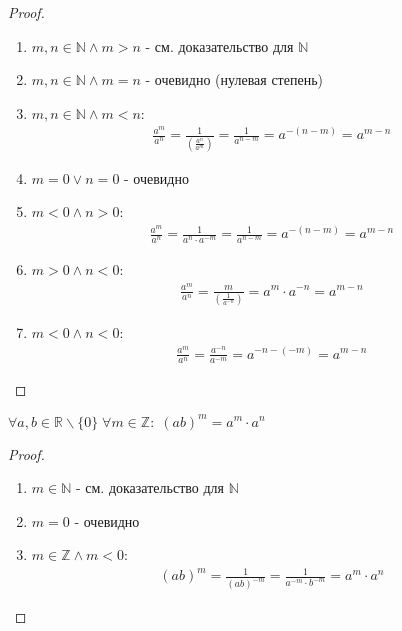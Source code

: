 \begin{proof}
    \hfill

    \begin{enumerate}
        \item $m,n \in \mathbb{N} \land m > n$ - см. доказательство для $\mathbb{N}$
        \item $m,n \in \mathbb{N} \land m = n$ - очевидно (нулевая степень)
        \item $m,n \in \mathbb{N} \land m < n$:
        \begin{align*}
            \frac{a^m}{a^n} = \frac{1}{(\frac{a^n}{a^m})} = \frac{1}{a^{n - m}} = a^{- (n - m)} = a^{m - n}
        \end{align*}
        \item $m = 0 \lor n = 0$ - очевидно
        \item $m < 0 \land n > 0$:
        \begin{align*}
            \frac{a^m}{a^n} = \frac{1}{a^{n} \cdot a^{-m}} = \frac{1}{a^{n - m}} = a^{- (n - m)} = a^{m - n}
        \end{align*}
        \item $m > 0 \land n < 0$:
        \begin{align*}
            \frac{a^m}{a^n} = \frac{m}{(\frac{1}{a^{-n}})} = a^{m} \cdot a^{-n}= a^{m - n}
        \end{align*}
        \item $m < 0 \land n < 0$:
        \begin{align*}
            \frac{a^m}{a^n} = \frac{a^{-n}}{a^{-m}} = a^{-n - (-m)} = a^{m - n}
        \end{align*}
    \end{enumerate}
\end{proof}

\break

\begin{theorem}
    $\forall a, b \in \mathbb{R} \backslash \{0\} \; \forall m \in \mathbb{Z}: \; (ab)^m = a^m \cdot a^n$
\end{theorem}

\begin{proof}
    \hfill

    \begin{enumerate}
        \item $m \in \mathbb{N}$ - см. доказательство для $\mathbb{N}$
        \item $m = 0$ - очевидно
        \item $m \in \mathbb{Z} \land m < 0$:
        \begin{align*}
            (ab)^m = \frac{1}{(ab)^{-m}} = \frac{1}{a^{-m} \cdot b^{-m}} = a^m \cdot a^n
        \end{align*}
    \end{enumerate}
\end{proof}
